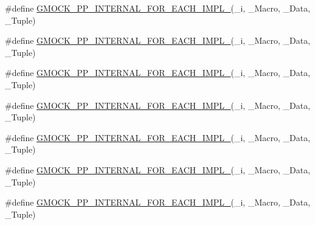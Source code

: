 \begin{DoxyCompactItemize}
\item 
\#define \mbox{\hyperlink{_obj__test_2lib_2googletest-master_2googlemock_2include_2gmock_2internal_2gmock-pp_8h_aff9ac7a5d231f8dac30c8436fffb887e}{G\+M\+O\+C\+K\+\_\+\+P\+P\+\_\+\+I\+N\+T\+E\+R\+N\+A\+L\+\_\+\+F\+O\+R\+\_\+\+E\+A\+C\+H\+\_\+\+I\+M\+P\+L\+\_}}(\+\_\+i,  \+\_\+\+Macro,  \+\_\+\+Data,  \+\_\+\+Tuple)
\item 
\#define \mbox{\hyperlink{_obj__test_2lib_2googletest-master_2googlemock_2include_2gmock_2internal_2gmock-pp_8h_affbf923847bedeff0e6b2a7c33f63ff8}{G\+M\+O\+C\+K\+\_\+\+P\+P\+\_\+\+I\+N\+T\+E\+R\+N\+A\+L\+\_\+\+F\+O\+R\+\_\+\+E\+A\+C\+H\+\_\+\+I\+M\+P\+L\+\_}}(\+\_\+i,  \+\_\+\+Macro,  \+\_\+\+Data,  \+\_\+\+Tuple)
\item 
\#define \mbox{\hyperlink{_obj__test_2lib_2googletest-master_2googlemock_2include_2gmock_2internal_2gmock-pp_8h_a07acbb7a6546c3c8e3f4f6c037831c54}{G\+M\+O\+C\+K\+\_\+\+P\+P\+\_\+\+I\+N\+T\+E\+R\+N\+A\+L\+\_\+\+F\+O\+R\+\_\+\+E\+A\+C\+H\+\_\+\+I\+M\+P\+L\+\_}}(\+\_\+i,  \+\_\+\+Macro,  \+\_\+\+Data,  \+\_\+\+Tuple)
\item 
\#define \mbox{\hyperlink{_obj__test_2lib_2googletest-master_2googlemock_2include_2gmock_2internal_2gmock-pp_8h_ae6a832612f7db9940c60e2551343f697}{G\+M\+O\+C\+K\+\_\+\+P\+P\+\_\+\+I\+N\+T\+E\+R\+N\+A\+L\+\_\+\+F\+O\+R\+\_\+\+E\+A\+C\+H\+\_\+\+I\+M\+P\+L\+\_}}(\+\_\+i,  \+\_\+\+Macro,  \+\_\+\+Data,  \+\_\+\+Tuple)
\item 
\#define \mbox{\hyperlink{_obj__test_2lib_2googletest-master_2googlemock_2include_2gmock_2internal_2gmock-pp_8h_a5f357dfae141ba984eec9f8e1ceb0bb7}{G\+M\+O\+C\+K\+\_\+\+P\+P\+\_\+\+I\+N\+T\+E\+R\+N\+A\+L\+\_\+\+F\+O\+R\+\_\+\+E\+A\+C\+H\+\_\+\+I\+M\+P\+L\+\_}}(\+\_\+i,  \+\_\+\+Macro,  \+\_\+\+Data,  \+\_\+\+Tuple)
\item 
\#define \mbox{\hyperlink{_obj__test_2lib_2googletest-master_2googlemock_2include_2gmock_2internal_2gmock-pp_8h_a70e6ea8b4a366244b729e56b3c2b0988}{G\+M\+O\+C\+K\+\_\+\+P\+P\+\_\+\+I\+N\+T\+E\+R\+N\+A\+L\+\_\+\+F\+O\+R\+\_\+\+E\+A\+C\+H\+\_\+\+I\+M\+P\+L\+\_}}(\+\_\+i,  \+\_\+\+Macro,  \+\_\+\+Data,  \+\_\+\+Tuple)
\item 
\#define \mbox{\hyperlink{_obj__test_2lib_2googletest-master_2googlemock_2include_2gmock_2internal_2gmock-pp_8h_ac43d06ac5ac29ce5b40e570c3c8b53ee}{G\+M\+O\+C\+K\+\_\+\+P\+P\+\_\+\+I\+N\+T\+E\+R\+N\+A\+L\+\_\+\+F\+O\+R\+\_\+\+E\+A\+C\+H\+\_\+\+I\+M\+P\+L\+\_}}(\+\_\+i,  \+\_\+\+Macro,  \+\_\+\+Data,  \+\_\+\+Tuple)
\item 

\end{DoxyCompactItemize}
